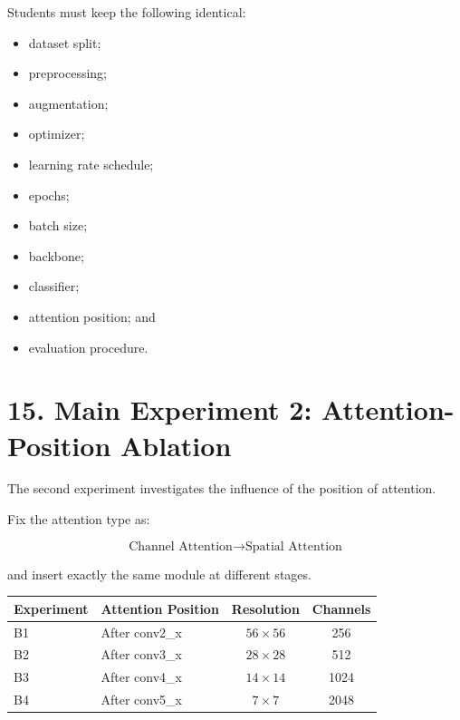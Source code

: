 \documentclass[10pt]{article}
\begin{document}
Students must keep the following identical:

\begin{itemize}

\item dataset split;

\item preprocessing;

\item augmentation;

\item optimizer;

\item learning rate schedule;

\item epochs;

\item batch size;

\item backbone;

\item classifier;

\item attention position; and

\item evaluation procedure.

\end{itemize}


\section*{15. Main Experiment 2: Attention-Position Ablation}

The second experiment investigates the influence of the position of
attention.

Fix the attention type as:

\[
\boxed{
\text{Channel Attention}
\rightarrow
\text{Spatial Attention}
}
\]

and insert exactly the same module at different stages.

\begin{center}

\begin{tabular}{|l|l|c|c|}
\hline

\textbf{Experiment}
&
\textbf{Attention Position}
&
\textbf{Resolution}
&
\textbf{Channels}
\\
\hline

B1
&
After conv2\_x
&
$56\times56$
&
256
\\
\hline

B2
&
After conv3\_x
&
$28\times28$
&
512
\\
\hline

B3
&
After conv4\_x
&
$14\times14$
&
1024
\\
\hline

B4
&
After conv5\_x
&
$7\times7$
&
2048
\\
\hline

\end{tabular}

\end{center}
\end{document}
